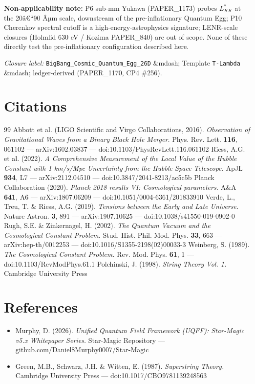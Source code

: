 \documentclass[12pt,a4paper]{article}
\begin{document}
\textbf{Non-applicability note:} P6 sub-mm Yukawa (PAPER\_1173) probes $L_{KK}^{*}$ at the 20â€``90 Âµm scale, downstream of the pre-inflationary Quantum Egg; P10 Cherenkov spectral cutoff is a high-energy-astrophysics signature; LENR-scale closures (Holmlid 630 eV / Kozima PAPER\_840) are out of scope. None of these directly test the pre-inflationary configuration described here.

\emph{Closure label:} \texttt{BigBang\_Cosmic\_Quantum\_Egg\_26D} \&mdash; Template \texttt{T-Lambda} \&mdash; ledger-derived (PAPER\_1170, CP4 \#256).


\section*{Citations}
\begin{thebibliography}{99}
 Abbott et al. (LIGO Scientific and Virgo Collaborations, 2016). \emph{Observation of Gravitational Waves from a Binary Black Hole Merger.} Phys. Rev. Lett. \textbf{116}, 061102 --- arXiv:1602.03837 --- doi:10.1103/PhysRevLett.116.061102
 Riess, A.G. et al. (2022). \emph{A Comprehensive Measurement of the Local Value of the Hubble Constant with 1 km/s/Mpc Uncertainty from the Hubble Space Telescope.} ApJL \textbf{934}, L7 --- arXiv:2112.04510 --- doi:10.3847/2041-8213/ac5c5b
 Planck Collaboration (2020). \emph{Planck 2018 results VI: Cosmological parameters.} A\&A \textbf{641}, A6 --- arXiv:1807.06209 --- doi:10.1051/0004-6361/201833910
 Verde, L., Treu, T. \& Riess, A.G. (2019). \emph{Tensions between the Early and Late Universe.} Nature Astron. \textbf{3}, 891 --- arXiv:1907.10625 --- doi:10.1038/s41550-019-0902-0
 Rugh, S.E. \& Zinkernagel, H. (2002). \emph{The Quantum Vacuum and the Cosmological Constant Problem.} Stud. Hist. Phil. Mod. Phys. \textbf{33}, 663 --- arXiv:hep-th/0012253 --- doi:10.1016/S1355-2198(02)00033-3
 Weinberg, S. (1989). \emph{The Cosmological Constant Problem.} Rev. Mod. Phys. \textbf{61}, 1 --- doi:10.1103/RevModPhys.61.1
 Polchinski, J. (1998). \emph{String Theory Vol. 1.} Cambridge University Press
\end{thebibliography}

\section*{References}
\begin{itemize}
  \item[2.] Murphy, D. (2026). \emph{Unified Quantum Field Framework (UQFF): Star-Magic v5.x Whitepaper Series.} Star-Magic Repository --- github.com/Daniel8Murphy0007/Star-Magic
  \item[8.] Green, M.B., Schwarz, J.H. \& Witten, E. (1987). \emph{Superstring Theory.} Cambridge University Press --- doi:10.1017/CBO9781139248563
\end{itemize}
\end{document}
